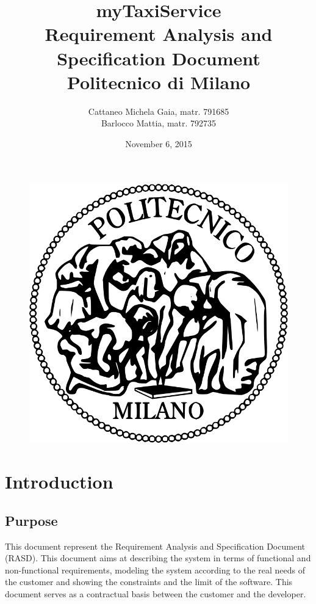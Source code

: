 \documentclass[18pt,oneside,a4paper, titlepage]{article}
\begin{document}
\begin{figure}[t]
	\centering
	\includegraphics[scale=0.35]{logo-polimi.png}
\end{figure}
\title{\textbf{myTaxiService}\\\textbf{R}equirement \textbf{A}nalysis and \textbf{S}pecification \textbf{D}ocument\\
	Politecnico di Milano}	
\author{Cattaneo Michela Gaia, matr. 791685\\Barlocco Mattia, matr. 792735 }
\date{November 6, 2015}
\maketitle

\newpage
\tableofcontents

\newpage
\section{Introduction}
	
	\subsection{Purpose}
		This document represent the Requirement Analysis and Specification Document (RASD). This document aims at describing the system in terms of functional and non-functional requirements, modeling the system according to the real needs of the customer and showing the constraints and the limit of the software. This document serves as a contractual basis between the customer and the developer.
	
\end{document}
